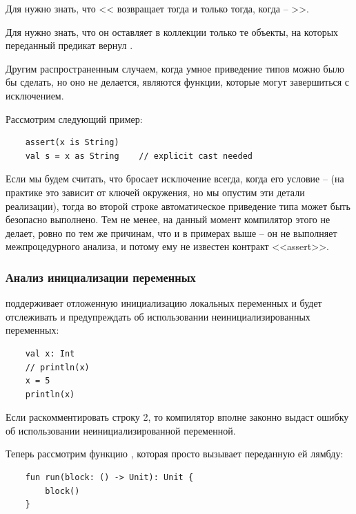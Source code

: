 Для  нужно знать, что << возвращает  тогда и только тогда, когда  -- >>. 

Для  нужно знать, что он оставляет в коллекции только те объекты, на которых переданный предикат вернул .


\bigskip

Другим распространенным случаем, когда умное приведение типов можно было бы сделать, но оно не делается, являются функции, которые могут завершиться с исключением. 

Рассмотрим следующий пример:

\begin{verbatim}
    assert(x is String)
    val s = x as String    // explicit cast needed
\end{verbatim}

Если мы будем считать, что  бросает исключение всегда, когда его условие --  (на практике это зависит от ключей окружения, но мы опустим эти детали реализации), тогда во второй строке автоматическое приведение типа может быть безопасно выполнено. Тем не менее, на данный момент компилятор  этого не делает, ровно по тем же причинам, что и в примерах выше -- он не выполняет межпроцедурного анализа, и потому ему не известен контракт <<assert>>. 




\subsubsection{Анализ инициализации переменных}

 поддерживает отложенную инициализацию локальных переменных и будет отслеживать и предупреждать об использовании неинициализированных переменных:

\begin{verbatim}
    val x: Int
    // println(x)
    x = 5
    println(x)
\end{verbatim}

Если раскомментировать строку 2, то компилятор вполне законно выдаст ошибку об использовании неинициализированной переменной. 

Теперь рассмотрим функцию , которая просто вызывает переданную ей лямбду: 
\begin{verbatim}
    fun run(block: () -> Unit): Unit {
        block()
    }
\end{verbatim}

